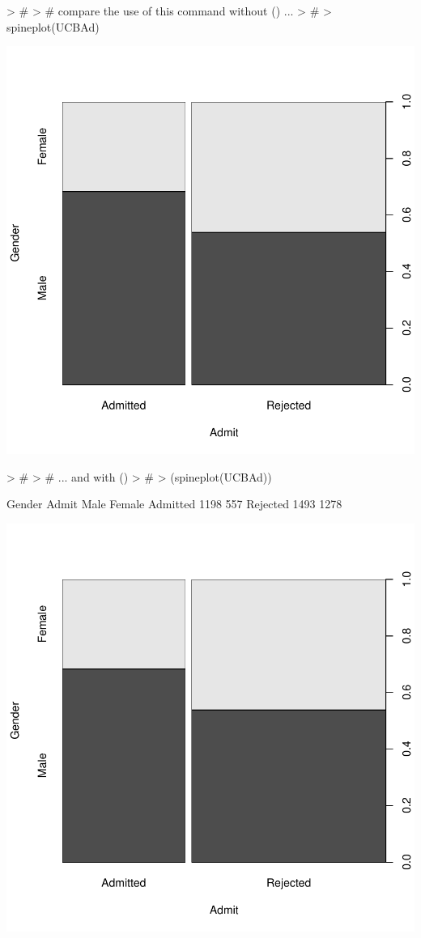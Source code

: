 \documentclass[12pt,letterpaper,final]{article}
\begin{document}
\begin{Schunk}
\begin{Sinput}
> #
> # compare the use of this command without () ...
> #
> spineplot(UCBAd)
\end{Sinput}
\end{Schunk}
\includegraphics{lect_main-047}

\begin{Schunk}
\begin{Sinput}
> #
> # ... and with ()
> #
> (spineplot(UCBAd))
\end{Sinput}
\begin{Soutput}
          Gender
Admit      Male Female
  Admitted 1198    557
  Rejected 1493   1278
\end{Soutput}
\end{Schunk}
\includegraphics{lect_main-048}
\end{document}
